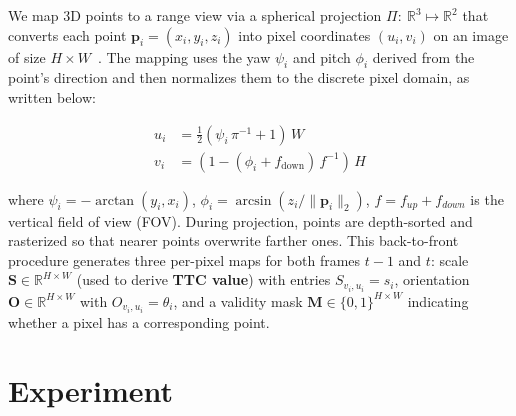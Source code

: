 \documentclass[journal]{IEEEtran}
\begin{document}

We map 3D points to a range view via a spherical projection \(\Pi:\ \mathbb{R}^3 \longmapsto \mathbb{R}^2\) that converts each point \(\mathbf{p}_i=(x_i,y_i,z_i)\) into pixel coordinates \((u_i,v_i)\) on an image of size \(H\times W\)~\cite{milioto2019rangenet++}. The mapping uses the yaw \(\psi_i\) and pitch \(\phi_i\) derived from the point’s direction and then normalizes them to the discrete pixel domain, as written below:

\begin{equation}
    \begin{aligned}
    u_i &= \tfrac{1}{2}\!\left(\psi_i\,\pi^{-1} + 1\right)\,W\\
    v_i &= \left(1 - (\phi_i + f_{\text{down}})\,f^{-1}\right)\,H
    \end{aligned}
    \label{equ:proj}
\end{equation}
    
where \(\psi_i = -\arctan(y_i, x_i)\), \(\phi_i = \arcsin(z_i / \lVert \mathbf{p}_i\rVert_2)\), \(f = f_{up} + f_{down}\) is the vertical field of view (FOV). 
During projection, points are depth-sorted and rasterized so that nearer points overwrite farther ones. 
This back-to-front procedure generates three per-pixel maps for both frames \(t-1\) and \(t\): scale \(\mathbf{S}\in\mathbb{R}^{H\times W}\) (used to derive \textbf{TTC value}) with entries \(S_{v_i,u_i}=s_i\), orientation \(\mathbf{O}\in\mathbb{R}^{H\times W}\) with \(O_{v_i,u_i}=\theta_i\), and a validity mask \(\mathbf{M}\in\{0,1\}^{H\times W}\) indicating whether a pixel has a corresponding point.

\section{Experiment}
\label{sec:exp}
\end{document}
